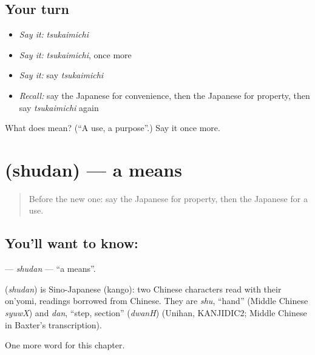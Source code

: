 \subsection*{Your turn}
\begin{itemize}
\raggedright
  \item \emph{Say it:} \emph{tsukaimichi}
  \item \emph{Say it:} \emph{tsukaimichi}, once more
  \item \emph{Say it:} say \emph{tsukaimichi}
  \item \emph{Recall:} say the Japanese for convenience, then the Japanese for property, then say \emph{tsukaimichi} again
\end{itemize}

\begin{tcolorbox}[breakable,colback=teal!4,colframe=teal!35!black,title={Before you move on}]
What does  mean? (\textquotedblleft{}A use, a purpose\textquotedblright{}.) Say it once more.
\end{tcolorbox}
\section[\texorpdfstring{\ja{しゅだん} (shudan)}{しゅだん (shudan)}]{ (shudan) — a means}

\label{lesson:JA-C97-shudan}



\begin{quote}
Before the new one: say the Japanese for property, then the Japanese for a use.
\end{quote}

\subsection*{You'll want to know: }
\textbf{} — \emph{shudan} — \textquotedblleft{}a means\textquotedblright{}.

\begin{cousinweb}
\textbf{} (\emph{shudan}) is Sino-Japanese (kango): two Chinese characters read with their on'yomi, readings borrowed from Chinese. They are \emph{shu}, \textquotedblleft{}hand\textquotedblright{} (Middle Chinese \emph{syuwX}) and \emph{dan}, \textquotedblleft{}step, section\textquotedblright{} (\emph{dwanH}) (Unihan, KANJIDIC2; Middle Chinese in Baxter's transcription).
\end{cousinweb}

\begin{grammarlens}[title={What you've built}]
One more word for this chapter.
\end{grammarlens}

